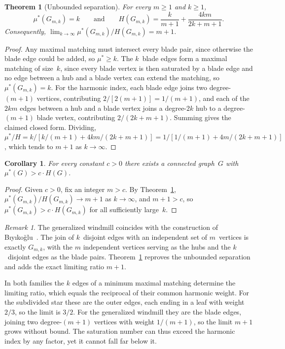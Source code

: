 \documentclass[11pt]{article}
\newtheorem{theorem}{Theorem}
\newtheorem{corollary}{Corollary}
\theoremstyle{definition}
\theoremstyle{remark}
\newtheorem{remark}{Remark}
\newcommand{\mustar}{\mu^{*}}
\begin{document}
\begin{theorem}[Unbounded separation]\label{thm:unbounded}
For every $m \ge 1$ and $k \ge 1$,
\[
  \mustar(G_{m,k}) = k
  \qquad\text{and}\qquad
  H(G_{m,k}) = \frac{k}{m+1} + \frac{4km}{2k+m+1}.
\]
Consequently, $\lim_{k \to \infty} \mustar(G_{m,k})/H(G_{m,k}) = m+1$.
\end{theorem}

\begin{proof}
Any
maximal matching must intersect every blade pair, since otherwise the blade
edge could be added, so $\mustar \ge k$.  The $k$~blade edges form a
maximal matching of size~$k$, since every blade vertex is then saturated by
a blade edge and no edge between a hub and a blade vertex can extend the
matching, so $\mustar(G_{m,k}) = k$.  For the harmonic index, each blade edge joins two
degree-$(m+1)$ vertices, contributing $2/[2(m+1)] = 1/(m+1)$, and each of
the $2km$ edges between a hub and a blade vertex joins a degree-$2k$ hub to
a degree-$(m+1)$ blade vertex, contributing $2/(2k+m+1)$.  Summing gives the
claimed closed form.  Dividing,
$\mustar/H = k/[k/(m{+}1) + 4km/(2k{+}m{+}1)]
= 1/[1/(m{+}1) + 4m/(2k{+}m{+}1)]$, which tends to $m+1$ as
$k \to \infty$.
\end{proof}

\begin{corollary}\label{cor:unbounded}
For every constant $c > 0$ there exists a connected graph~$G$ with
$\mustar(G) > c \cdot H(G)$.
\end{corollary}

\begin{proof}
Given $c > 0$, fix an integer $m > c$.  By Theorem~\ref{thm:unbounded},
$\mustar(G_{m,k})/H(G_{m,k}) \to m + 1$ as $k \to \infty$, and $m + 1 > c$, so
$\mustar(G_{m,k}) > c \cdot H(G_{m,k})$ for all sufficiently large~$k$.
\end{proof}

\begin{remark}\label{rem:biyikoglu}
The generalized windmill coincides with the construction of
B\i y\i ko\u{g}lu~\cite{Biyikoglu2026note}.  The join of $k$~disjoint edges
with an independent set of $m$~vertices is exactly $G_{m,k}$, with the $m$
independent vertices serving as the hubs and the $k$~disjoint edges as the
blade pairs.  Theorem~\ref{thm:unbounded} reproves the unbounded separation
and adds the exact limiting ratio $m+1$.
\end{remark}

In both families the $k$ edges of a minimum maximal matching determine the
limiting ratio, which equals the reciprocal of their common harmonic weight.
For the subdivided star these are the outer edges, each ending in a leaf with
weight $2/3$, so the limit is $3/2$.  For the generalized windmill they are
the blade edges, joining two degree-$(m+1)$ vertices with weight $1/(m+1)$,
so the limit $m+1$ grows without bound.  The saturation number can thus exceed
the harmonic index by any factor, yet it cannot fall far below it.
\end{document}
